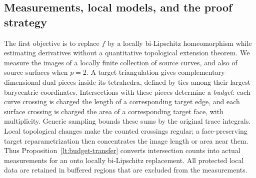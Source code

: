 \documentclass[11pt]{article}
\numberwithin{equation}{section}
\theoremstyle{definition}
\theoremstyle{remark}
\begin{document}
\subsection{Measurements, local models, and the proof strategy}

The first objective is to replace $f$ by a locally bi-Lipschitz
homeomorphism while estimating derivatives without a quantitative
topological extension theorem. We measure the images of a locally
finite collection of source curves, and also of source surfaces when
$p=2$. A target triangulation gives complementary-dimensional dual
pieces inside its tetrahedra, defined by ties among their largest
barycentric coordinates. Intersections with these pieces determine a
\emph{budget}: each curve
crossing is charged the length of a corresponding target edge, and
each surface crossing is charged the area of a corresponding target
face, with multiplicity. Generic sampling bounds these sums by the
original trace integrals. Local topological changes make the counted
crossings regular; a face-preserving target reparametrization then
concentrates the image length or area near them. Thus
Proposition~\ref{lt:budget-transfer} converts intersection counts into
actual measurements for an onto locally bi-Lipschitz replacement.
All protected local data are retained in buffered regions that are
excluded from the measurements.
\end{document}

